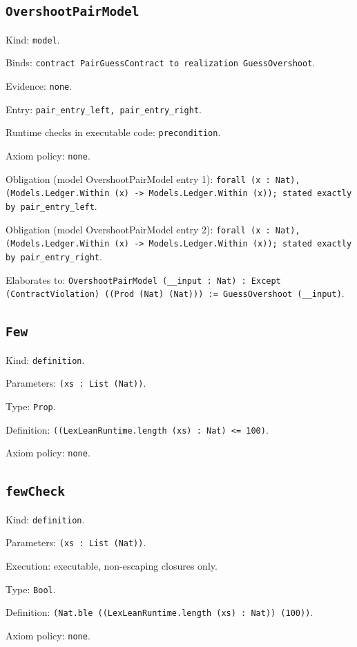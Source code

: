 \documentclass[11pt]{article}
\begin{document}
\subsection*{\texttt{OvershootPairModel}}
\noindent Kind: \texttt{model}.\par
\noindent Binds: \texttt{contract PairGuessContract to realization GuessOvershoot}.\par
\noindent Evidence: \texttt{none}.\par
\noindent Entry: \texttt{pair\_entry\_left, pair\_entry\_right}.\par
\noindent Runtime checks in executable code: \texttt{precondition}.\par
\noindent Axiom policy: \texttt{none}.\par
\noindent Obligation (model OvershootPairModel entry 1): \texttt{forall (x : Nat), (Models.Ledger.Within (x) -> Models.Ledger.Within (x)); stated exactly by pair\_entry\_left}.\par
\noindent Obligation (model OvershootPairModel entry 2): \texttt{forall (x : Nat), (Models.Ledger.Within (x) -> Models.Ledger.Within (x)); stated exactly by pair\_entry\_right}.\par
\noindent Elaborates to: \texttt{OvershootPairModel (\_\_input : Nat) : Except (ContractViolation) ((Prod (Nat) (Nat))) := GuessOvershoot (\_\_input)}.\par
\subsection*{\texttt{Few}}
\noindent Kind: \texttt{definition}.\par
\noindent Parameters: \texttt{(xs : List (Nat))}.\par
\noindent Type: \texttt{Prop}.\par
\noindent Definition: \texttt{((LexLeanRuntime.length (xs) : Nat) <= 100)}.\par
\noindent Axiom policy: \texttt{none}.\par
\subsection*{\texttt{fewCheck}}
\noindent Kind: \texttt{definition}.\par
\noindent Parameters: \texttt{(xs : List (Nat))}.\par
\noindent Execution: executable, non-escaping closures only.\par
\noindent Type: \texttt{Bool}.\par
\noindent Definition: \texttt{(Nat.ble ((LexLeanRuntime.length (xs) : Nat)) (100))}.\par
\noindent Axiom policy: \texttt{none}.\par
\end{document}
